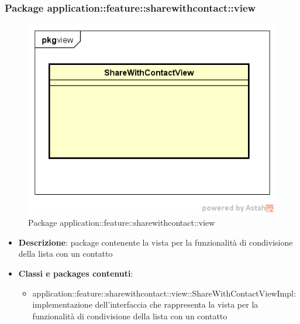 \subsubsection{Package application::feature::sharewithcontact::view}\label{Package application::feature::sharewithcontact::view}
\begin{figure}[H]
	\centering
	\includegraphics[scale=0.5]{Sezioni/Packages/Application/share_with_contact_view.png}
	\caption{Package application::feature::sharewithcontact::view}
\end{figure}
\begin{itemize}
	\item \textbf{Descrizione}: package contenente la vista per la funzionalità di condivisione della lista con un contatto
	\item \textbf{Classi e packages contenuti}:
	\begin{itemize}
	\item application::feature::sharewithcontact::view::ShareWithContactViewImpl: implementazione dell'interfaccia che rappresenta la vista per la funzionalità di condivisione della lista con un contatto
	\end{itemize}
\end{itemize}

